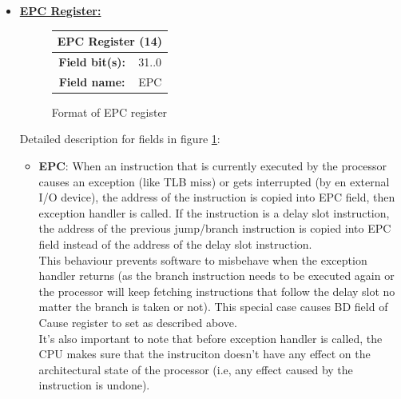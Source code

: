 \documentclass[]{scrartcl}
\begin{document}
\begin{itemize}
\begin{itemize}
\end{itemize}

\item \textbf{\underline{EPC Register:}}\\

\begin{figure}[H]
\begin{center}
\begin{tabular}{|c|c|}

\hline \multicolumn{2}{|c|}{EPC Register (14)} \\

\hline \textbf{Field bit(s):} & 31..0 \\

\hline \textbf{Field name:}   & EPC   \\

\hline

\end{tabular}

\end{center}
\caption{Format of EPC register}
\label{epc_reg}
\end{figure}

Detailed description for fields in figure \ref{epc_reg}:

\begin{itemize}

\item \textbf{EPC}: When an instruction that is currently
      executed by the processor causes an exception (like
      TLB miss) or gets interrupted (by en external I/O device),
      the address of the instruction is copied into EPC field,
      then exception handler is called. 
      If the instruction is a delay slot instruction, the address
      of the previous jump/branch instruction is copied into
      EPC field instead of the address of the delay slot instruction.\\
      
      This behaviour prevents software to misbehave when the exception
      handler returns (as the branch instruction needs to be executed 
      again or the processor will keep fetching instructions that follow
      the delay slot no matter the branch is taken or not). This
      special case causes BD field of Cause register to set as
      described above.\\
       
      It's also important to note
      that before exception handler is called, the CPU makes
      sure that the instruciton doesn't have any effect on
      the architectural state of the processor (i.e, any
      effect caused by the instruction is undone).

\end{itemize}

\end{itemize}
\end{document}
